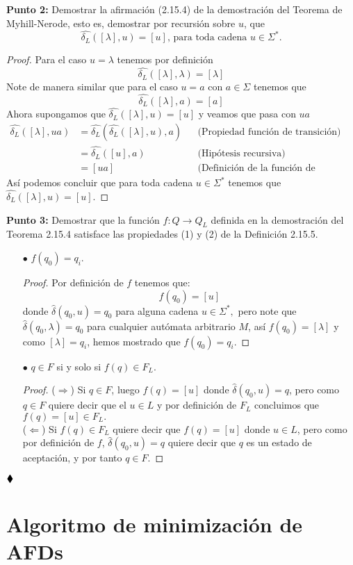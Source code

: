 \textbf{Punto 2: }Demostrar la afirmación (2.15.4) de la demostración del Teorema de Myhill-Nerode, esto es, demostrar por recursión sobre $u$, que
$$\widehat{\delta_L}([\lambda],u)=[u]\text{, para toda cadena }u\in\Sigma^*.$$
\begin{proof}
    Para el caso $u=\lambda$ tenemos por definición
    $$\widehat{\delta_L}([\lambda],\lambda)=[\lambda]$$
    Note de manera similar que para el caso $u=a$ con $a\in\Sigma$ tenemos que
    $$\widehat{\delta_L}([\lambda],a)=[a]$$
    Ahora supongamos que $\widehat{\delta_L}([\lambda],u)=[u]$ y veamos que pasa con $ua$
    \begin{align*}
       \widehat{\delta_L}([\lambda],ua)&=\widehat{\delta_L}(\widehat{\delta_L}([\lambda],u),a)&&\text{(Propiedad función de transición)}\\
       &=\widehat{\delta_L}([u],a)&&\text{(Hipótesis recursiva)} \\
       &=[ua]&&\text{(Definición de la función de transición).}
    \end{align*}
Así podemos concluir que para toda cadena $u\in\Sigma^*$ tenemos que $\widehat{\delta_L}([\lambda],u)=[u].$
\end{proof}
\textbf{Punto 3: }Demostrar que la función $f:Q\to Q_L$ definida en la demostración del Teorema 2.15.4 satisface las propiedades (1) y (2) de la Definición 2.15.5.
\begin{itemize}
    \item[$\bullet$]$f(q_0)=q_i.$
\begin{proof}
    Por definición de $f$ tenemos que:
    $$f(q_0)=[u]$$ 
    donde $\widehat{\delta}(q_0,u)=q_0$ para alguna cadena $u\in\Sigma^*,$ pero note que $\widehat{\delta}(q_0,\lambda)=q_0$ para cualquier autómata arbitrario $M$, así $f(q_0)=[\lambda]$ y como $[\lambda]=q_i$, hemos mostrado que $f(q_0)=q_i$. 
\end{proof}
    \item[$\bullet$]$q\in F$ si y solo si $f(q)\in F_L.$
    \begin{proof}
        ($\Rightarrow$) Si $q\in F$, luego $f(q)=[u]$ donde $\widehat{\delta}(q_0,u)=q$, pero como $q\in F$ quiere decir que el $u\in L$ y por definición de $F_L$ concluimos que $f(q)=[u]\in F_L.$\\
        ($\Leftarrow$) Si $f(q)\in F_L$ quiere decir que $f(q)=[u]$ donde $u\in L$, pero como por definición de $f$, $\widehat{\delta}(q_0,u)=q$ quiere decir que $q$ es un estado de aceptación, y por tanto $q\in F.$
    \end{proof}
\end{itemize}
$\hfill \blacklozenge$
\section{Algoritmo de minimización de AFDs}

